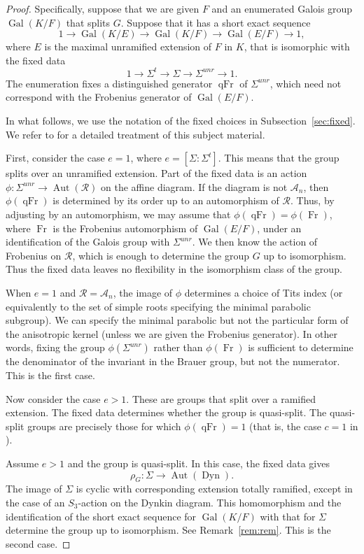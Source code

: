 \documentclass[12pt]{amsart}
\newcommand{\op}[1]{\operatorname{#1}}
\newcommand{\cal}[1]{\mathcal{#1}}
\def\R{\cal{R}}
\theoremstyle{plain}
\theoremstyle{definition}
\begin{document}
\begin{proof}
  Specifically, suppose that we are given $F$ and an enumerated Galois
  group $\op{Gal}(K/F)$ that splits $G$.  Suppose that it has a short
  exact sequence
\[
1 \to\op{Gal}(K/E)\to \op{Gal}(K/F) \to \op{Gal}(E/F)\to 1,
\]
where $E$ is the maximal unramified extension of $F$ in $K$,
that is isomorphic with the fixed data
\[
1 \to\Sigma^t\to\Sigma\to\Sigma^{unr}\to 1.
\]
The enumeration fixes a distinguished generator $\op{qFr}$ of
$\Sigma^{unr}$, which need not correspond with the Frobenius generator
of $\op{Gal}(E/F)$.

In what follows, we use the notation of the fixed choices in
Subsection~\ref{sec:fixed}.  We refer to \cite{Gross} for a detailed
treatment of this subject material.

First, consider the case $e=1$, where $e=[\Sigma:\Sigma^t]$.  This
means that the group splits over an unramified extension.  Part of the
fixed data is an action $\phi:\Sigma^{unr}\to \op{Aut}(\R)$ on the
affine diagram.  If the diagram is not $\cal{A}_n$, then $\phi(\op{qFr})$
is determined by its order up to an automorphism of $\R$.  Thus, by
adjusting by an automorphism, we may assume that
$\phi(\op{qFr})=\phi(\op{Fr})$, where $\op{Fr}$ is the Frobenius
automorphism of $\op{Gal}(E/F)$, under an identification of the
Galois group with $\Sigma^{unr}$.  We then know the action of Frobenius 
on $\R$, which is enough to determine the group $G$ up to isomorphism.
Thus the fixed data leaves no flexibility in the isomorphism class of the group.

When $e=1$ and $\R = \cal{A}_n$, the image of $\phi$ determines
a choice of Tits index (or equivalently to the set of simple roots
specifying the minimal parabolic subgroup).  We can specify the
minimal parabolic but not the particular form of the anisotropic
kernel (unless we are given the Frobenius generator).  In other words,
fixing the group $\phi(\Sigma^{unr})$ rather than $\phi(\op{Fr})$ is
sufficient to determine the denominator of the invariant in the Brauer
group, but not the numerator.  This is the first case.

Now consider the case $e>1$.  These are groups that split over a
ramified extension.  The fixed data determines whether the group is
quasi-split.  The quasi-split groups are precisely those for which
$\phi(\op{qFr})=1$ (that is, the case $c=1$ in \cite[\S7]{Gross}).

Assume $e>1$ and the group is quasi-split. 
In this case, the fixed data gives
\[
\rho_G:\Sigma\to \op{Aut}(\op{Dyn}).
\]
The image of $\Sigma$ is cyclic with corresponding extension totally
ramified, except in the case of an $S_3$-action on the Dynkin diagram.
This homomorphism and the identification of the short exact sequence
for $\op{Gal}(K/F)$ with that for $\Sigma$ determine the group up to
isomorphism.  See Remark~\ref{rem:rem}.  This is the second case.


\end{proof}
\end{document}
